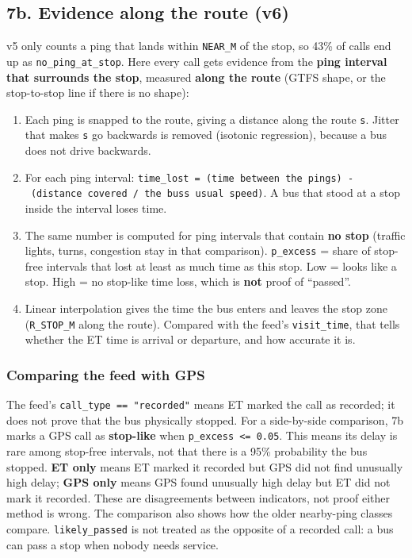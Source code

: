 \documentclass[11pt]{article}
\providecommand{\tightlist}{%
      \setlength{\itemsep}{0pt}\setlength{\parskip}{0pt}}
\begin{document}
    
    \subsection{7b. Evidence along the route
(v6)}\label{b.-evidence-along-the-route-v6}

v5 only counts a ping that lands within \texttt{NEAR\_M} of the stop, so
43\% of calls end up as \texttt{no\_ping\_at\_stop}. Here every call
gets evidence from the \textbf{ping interval that surrounds the stop},
measured \textbf{along the route} (GTFS shape, or the stop-to-stop line
if there is no shape):

\begin{enumerate}
\def\labelenumi{\arabic{enumi}.}
\tightlist
\item
  Each ping is snapped to the route, giving a distance along the route
  \texttt{s}. Jitter that makes \texttt{s} go backwards is removed
  (isotonic regression), because a bus does not drive backwards.
\item
  For each ping interval:
  \texttt{time\_lost\ =\ (time\ between\ the\ pings)\ -\ (distance\ covered\ /\ the\ bus\textquotesingle{}s\ usual\ speed)}.
  A bus that stood at a stop inside the interval loses time.
\item
  The same number is computed for ping intervals that contain \textbf{no
  stop} (traffic lights, turns, congestion stay in that comparison).
  \texttt{p\_excess} = share of stop-free intervals that lost at least
  as much time as this stop. Low = looks like a stop. High = no
  stop-like time loss, which is \textbf{not} proof of ``passed''.
\item
  Linear interpolation gives the time the bus enters and leaves the stop
  zone (\texttt{R\_STOP\_M} along the route). Compared with the feed's
  \texttt{visit\_time}, that tells whether the ET time is arrival or
  departure, and how accurate it is.
\end{enumerate}

\subsubsection{Comparing the feed with
GPS}\label{comparing-the-feed-with-gps}

The feed's \texttt{call\_type\ ==\ "recorded"} means ET marked the call
as recorded; it does not prove that the bus physically stopped. For a
side-by-side comparison, 7b marks a GPS call as \textbf{stop-like} when
\texttt{p\_excess\ \textless{}=\ 0.05}. This means its delay is rare
among stop-free intervals, not that there is a 95\% probability the bus
stopped. \textbf{ET only} means ET marked it recorded but GPS did not
find unusually high delay; \textbf{GPS only} means GPS found unusually
high delay but ET did not mark it recorded. These are disagreements
between indicators, not proof either method is wrong. The comparison
also shows how the older nearby-ping classes compare.
\texttt{likely\_passed} is not treated as the opposite of a recorded
call: a bus can pass a stop when nobody needs service.
\end{document}
